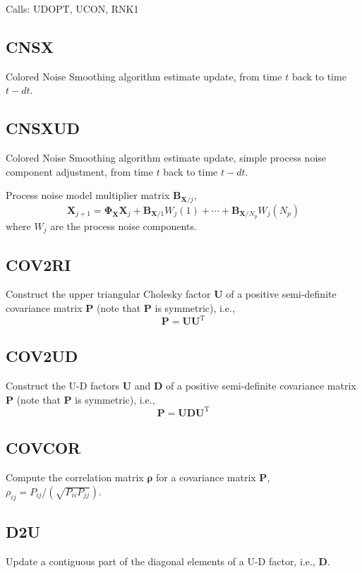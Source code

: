 \documentclass[./doc.tex]{subfiles}
\begin{document}
Calls: UDOPT, UCON, RNK1

\subsection{CNSX}
Colored Noise Smoothing algorithm estimate update, from time \(t\) back to time \(t-dt\).

\subsection{CNSXUD}
Colored Noise Smoothing algorithm estimate update, simple process noise component
adjustment, from time \(t\) back to time \(t-dt\).

Process noise model multiplier matrix \(\bm{B}_{\bm{X}/j}\),
\begin{equation}
    \bm{X}_{j+1} = \bm{\Phi}_{\bm{X}} \bm{X}_j + \bm{B}_{\bm{X}/1} W_{j}(1) + \cdots + \bm{B}_{\bm{X}/N_p} W_{j}(N_p)
\end{equation}
where \(W_j\) are the process noise components.

\subsection{COV2RI}
Construct the upper triangular Cholesky factor \(\bm{U}\) of a positive semi-definite covariance matrix
\(\bm{P}\) (note that \(\bm{P}\) is symmetric), i.e.,
\begin{equation}
    \bm{P}=\bm{U}\bm{U}^{\textrm{T}}
\end{equation}

\subsection{COV2UD}
Construct the U-D factors \(\bm{U}\) and \(\bm{D}\) of a positive semi-definite covariance matrix
\(\bm{P}\) (note that \(\bm{P}\) is symmetric), i.e.,
\begin{equation}
    \bm{P}=\bm{U}\bm{D}\bm{U}^{\textrm{T}}
\end{equation}

\subsection{COVCOR}
Compute the correlation matrix \(\bm{\rho}\) for a covariance matrix \(\bm{P}\), \(\rho_{ij}=P_{ij}/(\sqrt{P_{ii}P_{jj}})\).

\subsection{D2U}
Update a contiguous part of the diagonal elements of a U-D factor, i.e., \(\bm{D}\).
\end{document}
